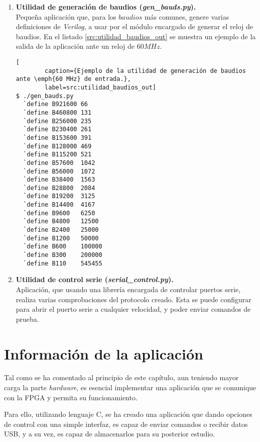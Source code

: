 \begin{enumerate}
    \item \textbf{Utilidad de generación de baudios (\emph{gen\_bauds.py}).} \\
    Pequeña aplicación que, para los $baudios$ más comunes, genere varias definiciones de \emph{Verilog}, a usar por el módulo encargado de generar el reloj de baudios. En el listado \ref{src:utilidad_baudios_out} se muestra un ejemplo de la salida de la aplicación ante un reloj de $60MHz$.
    \begin{lstlisting}[
        caption={Ejemplo de la utilidad de generación de baudios ante \emph{60 MHz} de entrada.},
        label=src:utilidad_baudios_out]
$ ./gen_bauds.py
  `define B921600 66
  `define B460800 131
  `define B256000 235
  `define B230400 261
  `define B153600 391
  `define B128000 469
  `define B115200 521
  `define B57600  1042
  `define B56000  1072
  `define B38400  1563
  `define B28800  2084
  `define B19200  3125
  `define B14400  4167
  `define B9600   6250
  `define B4800   12500
  `define B2400   25000
  `define B1200   50000
  `define B600    100000
  `define B300    200000
  `define B110    545455
    \end{lstlisting}
    
    \item \textbf{Utilidad de control serie (\emph{serial\_control.py}).} \\
    Aplicación, que usando una librería encargada de controlar puertos serie, realiza varias comprobaciones del protocolo creado. Esta se puede configurar para abrir el puerto serie a cualquier velocidad, y poder enviar comandos de prueba.
\end{enumerate}

\section{Información de la aplicación}
Tal como se ha comentado al principio de este capítulo, aun teniendo mayor carga la parte \emph{hardware}, es esencial implementar una aplicación que se comunique con la FPGA y permita su funcionamiento.

Para ello, utilizando lenguaje C, se ha creado una aplicación que dando opciones de control con una simple interfaz, es capaz de enviar comandos o recibir datos USB, y a su vez, es capaz de almacenarlos para su posterior estudio.

